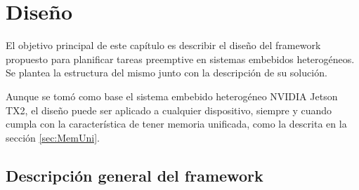 

\chapter{Diseño}\label{cha:Diseño}

El objetivo principal de este capítulo es describir el diseño del framework propuesto para planificar tareas preemptive en sistemas embebidos heterogéneos. Se plantea la estructura del mismo junto con la descripción de su solución. 

Aunque se tomó como base el sistema embebido heterogéneo NVIDIA Jetson TX2, el diseño puede ser aplicado a cualquier dispositivo, siempre y cuando cumpla con la característica de tener memoria unificada, como la descrita en la sección \ref{sec:MemUni}.

\section{Descripción general del framework}


